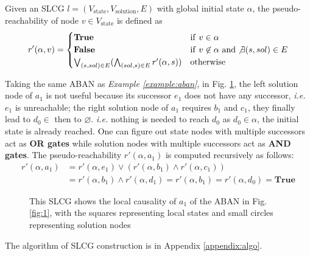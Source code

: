 \documentclass[runningheads]{llncs}
\begin{document}
\begin{definition}\label{defPseudoReach}
Given an SLCG $l=(V_{\mathrm{state}},V_{\mathrm{solution}},E)$ with global initial state $\alpha$, the pseudo-reachability of node $v\in V_{\mathrm{state}}$ is defined as
\begin{equation}
\nonumber
    r'(\alpha,v)=
    \begin{cases}
    \mathrm{\bf True} & {\rm if\ } v\in \alpha\\
    \mathrm{\bf False} & {\rm if\ } v\not\in \alpha\ {\rm and} \not\exists(s,sol) \in E\\
    \bigvee_{(s,sol) \in E} (\bigwedge_{(sol,s)\in E} r'(\alpha,s)) & {\rm otherwise}
\end{cases}
\end{equation}

\end{definition}
\begin{example}\label{example:SLCG}
Taking the same ABAN as \textit{Example \ref{example:aban}}, in Fig. \ref{fig:2}, the left solution node of $a_1$ is not useful because its successor $e_1$ does not have any successor, \textit{i.e.} $e_1$ is unreachable;
the right solution node of $a_1$ requires $b_1$ and $c_1$, they finally lead to $d_0\in$ then to $\varnothing$.
\textit{i.e.} nothing is needed to reach $d_0$ as $d_0\in \alpha$, the initial state is already reached.
One can figure out state nodes with multiple successors act as \textbf{OR gates} while solution nodes with multiple successors act as \textbf{AND gates}. The pseudo-reachability $r'(\alpha,a_1)$ is computed recursively as follows:
\begin{align*}
r'(\alpha,a_1)&=r'(\alpha,e_1)\lor(r'(\alpha,b_1)\land r'(\alpha,c_1))\\
&=r'(\alpha,b_1)\land r'(\alpha,d_1)=r'(\alpha,b_1)=r'(\alpha,d_0)=\mathbf{True}
\end{align*}
\end{example}

\begin{figure}[ht]
\centering

\caption{This SLCG shows the local causality of $a_1$ of the ABAN in Fig. \ref{fig:1}, with the squares representing local states and small circles representing solution nodes}
\label{fig:2}
\end{figure}

The algorithm of SLCG construction is in Appendix \ref{appendix:algo}.
\end{document}
